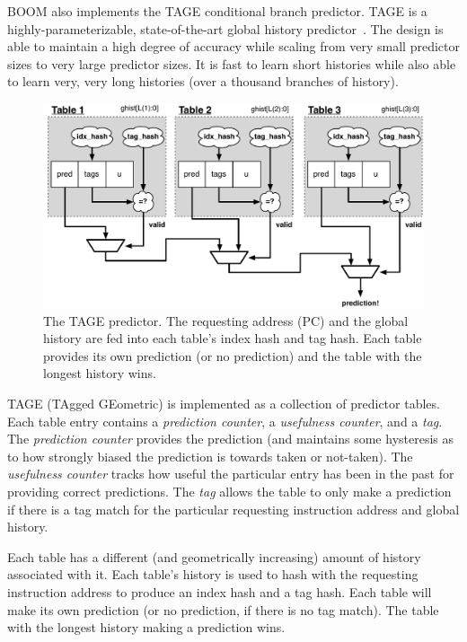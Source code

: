 BOOM also implements the TAGE conditional branch predictor. TAGE is a highly-parameterizable, state-of-the-art global history predictor~\cite{seznec2006case, seznec2011new}.  The design is able to maintain a high degree of accuracy while scaling from very small predictor sizes to very large predictor sizes. It is fast to learn short histories while also able to learn very, very long histories (over a thousand branches of history).  


\begin{figure}[ht]
	\centering
	\centerline{\includegraphics[scale =0.80] {figures/tage}}
	\caption{ \small The TAGE predictor. The requesting address (PC) and the global history are fed into each table's index hash and tag hash. Each table provides its own prediction (or no prediction) and the table with the longest history wins.}
	\label{fig:tage}
\end{figure}


TAGE (TAgged GEometric) is implemented as a collection of predictor tables. Each table entry contains a {\em prediction counter}, a {\em usefulness counter}, and a {\em tag}. The {\em prediction counter} provides the prediction (and maintains some hysteresis as to how strongly biased the prediction is towards taken or not-taken). The {\em usefulness counter} tracks how useful the particular entry has been in the past for providing correct predictions.  The {\em tag} allows the table to only make a prediction if there is a tag match for the particular requesting instruction address and global history.

Each table has a different (and geometrically increasing) amount of history associated with it.  Each table's history is used to hash with the requesting instruction address to produce an index hash and a tag hash.  Each table will make its own prediction (or no prediction, if there is no tag match).  The table with the longest history making a prediction wins. 

